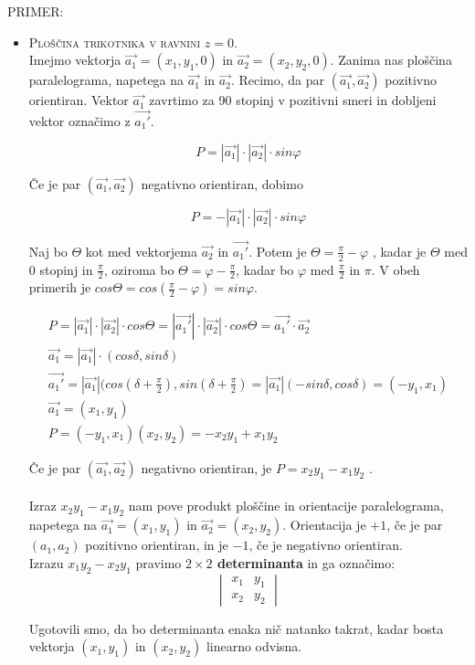\documentclass[a4paper,12pt]{article}
\begin{document}
PRIMER:
\begin{itemize}
\item \textsc{Ploščina trikotnika v ravnini $z=0$.} \\

Imejmo vektorja $\vec{a_1} = (x_1, y_1, 0)$ in $\vec{a_2} = (x_2, y_2, 0)$. Zanima nas ploščina paralelograma, napetega na $\vec{a_1}$ in $\vec{a_2}$. Recimo, da par $ (\vec{a_1}, \vec{a_2})$ pozitivno orientiran. Vektor $\vec{a_1}$ zavrtimo za 90 stopinj v pozitivni smeri in dobljeni vektor označimo z $\vec{a_1'}$. 

$$ P = |\vec{a_1}| \cdot |\vec{a_2}| \cdot sin\varphi$$ 

Če je par $(\vec{a_1}, \vec{a_2})$ negativno orientiran, dobimo

$$ P = - | \vec{a_1} | \cdot | \vec{a_2}| \cdot sin\varphi $$

Naj bo $\Theta$ kot med vektorjema $\vec{a_2}$ in $\vec{a_1'}$. Potem je $\Theta = \frac{\pi}{2} - \varphi$ , kadar je $\Theta$ med 0 stopinj in $\frac{\pi}{2}$, oziroma bo $\Theta = \varphi - \frac{\pi}{2}$, kadar bo $\varphi$ med $\frac{\pi}{2}$ in $\pi$. V obeh primerih je $cos\Theta = cos(\frac{\pi}{2} - \varphi) = sin \varphi$. 

\begin{gather*}
P = |\vec{a_1}| \cdot |\vec{a_2}| \cdot cos\Theta = |\vec{a_1'}| \cdot |\vec{a_2}| \cdot cos\Theta = \vec{a_1'} \cdot \vec{a_2} \\
 \vec{a_1} = |\vec{a_1} | \cdot (cos\delta, sin\delta)\\
\vec{a_1'} = |\vec{a_1}| (cos(\delta + \frac{\pi}{2}), sin(\delta + \frac{\pi}{2})  = |\vec{a_1}| (- sin\delta, cos\delta) = (- y_1, x_1) \\
 \vec{a_1} = (x_1, y_1) \\
 P = (- y_1, x_1)(x_2,y_2) = - x_2 y_1 + x_1 y_2 
\end{gather*}

Če je par $(\vec{a_1}, \vec{a_2})$ negativno orientiran, je $ P = x_2 y_1 - x_1 y_2 $ . 
\\ 
\\
Izraz $x_2 y_1 - x_1 y_2 $ nam pove produkt ploščine in orientacije paralelograma, napetega na $\vec{a_1} = (x_1, y_1)$ in $\vec{a_2} = (x_2, y_2)$. Orientacija je $+1$, če je par $(a_1,a_2)$ pozitivno orientiran, in je $-1$, če je negativno orientiran. \\

Izrazu $x_1 y_2 - x_2 y_1$ pravimo \textbf{$2 \times 2$ determinanta} in ga označimo: 
$$
\begin{vmatrix}
x_1 &  y_1  \\
x_2 & y_2 
\end{vmatrix} 
$$

Ugotovili smo, da bo determinanta enaka nič natanko takrat, kadar bosta vektorja $(x_1, y_1)$ in $(x_2, y_2)$ linearno odvisna. \\

\end{itemize}
\end{document}
